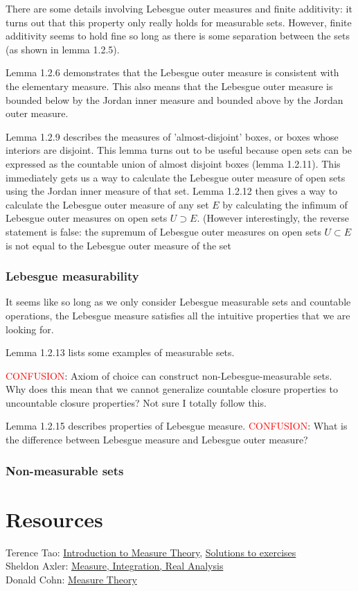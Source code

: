 \documentclass[answers,12pt]{exam}
\begin{document}
There are some details involving Lebesgue outer measures and finite additivity:
it turns out that this property only really holds for measurable sets.
However, finite additivity seems to hold fine so long as there is some separation between the sets (as shown in lemma 1.2.5).

Lemma 1.2.6 demonstrates that the Lebesgue outer measure is consistent with the elementary measure.
This also means that the Lebesgue outer measure is bounded below by the Jordan inner measure and bounded above by the Jordan outer measure.

Lemma 1.2.9 describes the measures of 'almost-disjoint' boxes, or boxes whose interiors are disjoint.
This lemma turns out to be useful because open sets can be expressed as the countable union of almost disjoint boxes (lemma 1.2.11).
This immediately gets us a way to calculate the Lebesgue outer measure of open sets using the Jordan inner measure of that set.
Lemma 1.2.12 then gives a way to calculate the Lebesgue outer measure of any set $E$ by calculating the infimum of Lebesgue outer measures on open sets $U \supset E$.
(However interestingly, the reverse statement is false: the supremum of Lebesgue outer measures on open sets $U \subset E$ is not equal to the Lebesgue outer measure of the set

\subsubsection{Lebesgue measurability}
It seems like so long as we only consider Lebesgue measurable sets and countable operations, the Lebesgue measure satisfies all the intuitive properties that we are looking for.

Lemma 1.2.13 lists some examples of measurable sets.

\textcolor{red}{CONFUSION}: Axiom of choice can construct non-Lebesgue-measurable sets.
Why does this mean that we cannot generalize countable closure properties to uncountable closure properties?
Not sure I totally follow this.

Lemma 1.2.15 describes properties of Lebesgue measure.
\textcolor{red}{CONFUSION}: What is the difference between Lebesgue measure and Lebesgue outer measure?

\subsubsection{Non-measurable sets}

\section{Resources}
Terence Tao: \href{https://terrytao.files.wordpress.com/2012/12/gsm-126-tao5-measure-book.pdf}{Introduction to Measure Theory}, \href{https://math.solverer.com/library/terence_tao/an_introduction_to_measure_theory}{Solutions to exercises}\\
Sheldon Axler: \href{https://measure.axler.net/MIRA.pdf}{Measure, Integration, Real Analysis}\\
Donald Cohn: \href{https://www.fayoum.edu.eg/stfsys/stfFiles/273/1342/Measure%20Theory%20(2nd%20ed.)%20-%20Cohn,%20Donald%20L._5990.pdf}{Measure Theory}
\end{document}
